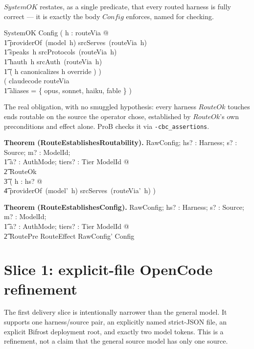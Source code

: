 \documentclass{article}
\makeatletter
\newenvironment{theorem}[1]{\medskip\noindent\textbf{Theorem (#1).}\@nameuse{zed}}{\@nameuse{endzed}}
\makeatother
\begin{document}
$SystemOK$ restates, as a single predicate, that every routed harness is fully
correct --- it is exactly the body $Config$ enforces, named for checking.

\begin{schema}{SystemOK}
	Config
	\where
	( \forall h : \dom routeVia @ \\
	\t1 providerOf~(model~h) \in srcServes~(routeVia~h) \land \\
	\t1 speaks~h \in srcProtocols~(routeVia~h) \land \\
	\t1 hauth~h \in srcAuth~(routeVia~h) \land \\
	\t1 ( h \in canonicalizes \implies h \in override ) ) \land \\
	( claudecode \in \dom routeVia \implies \\
	\t1 \dom aliases = \{ opus, sonnet, haiku, fable \} )
\end{schema}

The real obligation, with no smuggled hypothesis: every harness $RouteOk$
touches ends routable on the source the operator chose, established by $RouteOk$'s
own preconditions and effect alone. ProB checks it via \texttt{-cbc\_assertions}.

\begin{theorem}{RouteEstablishesRoutability}
	\forall \Delta RawConfig; hs? : \power Harness; s? : Source; m? : ModelId; \\
	\t1 a? : AuthMode; tiers? : Tier \pfun ModelId @ \\
	\t2 RouteOk \implies \\
	\t3 ( \forall h : hs? @ \\
	\t4 providerOf~(model'~h) \in srcServes~(routeVia'~h) )
\end{theorem}

\begin{theorem}{RouteEstablishesConfig}
	\forall \Delta RawConfig; hs? : \power Harness; s? : Source; m? : ModelId; \\
	\t1 a? : AuthMode; tiers? : Tier \pfun ModelId @ \\
	\t2 RoutePre \land RouteEffect \implies \theta RawConfig' \in Config
\end{theorem}

\section{Slice 1: explicit-file OpenCode refinement}

The first delivery slice is intentionally narrower than the general model.  It
supports one harness/source pair, an explicitly named strict-JSON file, an
explicit Bifrost deployment root, and exactly two model tokens.  This is a
refinement, not a claim that the general source model has only one source.
\end{document}
